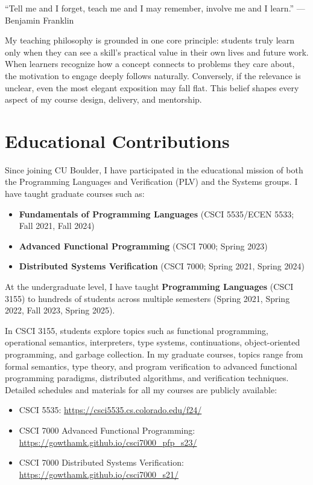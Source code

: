 \begin{mdquote}
``Tell me and I forget, teach me and I may remember, involve me and I learn.'' --- Benjamin Franklin
\end{mdquote}

My teaching philosophy is grounded in one core principle: students truly learn only when they can see a skill’s practical value in their own lives and future work. When learners recognize how a concept connects to problems they care about, the motivation to engage deeply follows naturally. Conversely, if the relevance is unclear, even the most elegant exposition may fall flat. This belief shapes every aspect of my course design, delivery, and mentorship.

\section*{Educational Contributions}
Since joining CU Boulder, I have participated in the educational mission of both the Programming Languages and Verification (PLV) and the Systems groups. I have taught graduate courses such as:
\begin{itemize}
    \item \textbf{Fundamentals of Programming Languages} (CSCI 5535/ECEN 5533; Fall 2021, Fall 2024)
    \item \textbf{Advanced Functional Programming} (CSCI 7000; Spring 2023)
    \item \textbf{Distributed Systems Verification} (CSCI 7000; Spring 2021, Spring 2024)
\end{itemize}
At the undergraduate level, I have taught \textbf{Programming Languages} (CSCI 3155) to hundreds of students across multiple semesters (Spring 2021, Spring 2022, Fall 2023, Spring 2025). 

In CSCI 3155, students explore topics such as functional programming, operational semantics, interpreters, type systems, continuations, object-oriented programming, and garbage collection. In my graduate courses, topics range from formal semantics, type theory, and program verification to advanced functional programming paradigms, distributed algorithms, and verification techniques. Detailed schedules and materials for all my courses are publicly available:
\begin{itemize}
    \item CSCI 5535: \url{https://csci5535.cs.colorado.edu/f24/}
    \item CSCI 7000 Advanced Functional Programming: \url{https://gowthamk.github.io/csci7000_pfp_s23/}
    \item CSCI 7000 Distributed Systems Verification: \url{https://gowthamk.github.io/csci7000_s21/}
\end{itemize}

